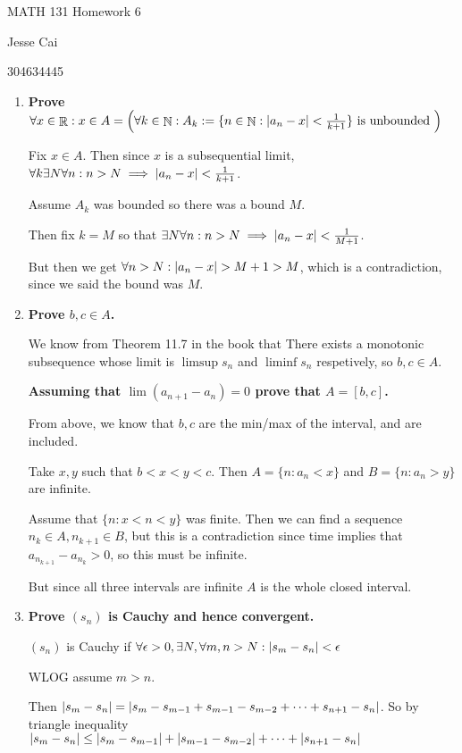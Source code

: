 \documentclass[10pt,a4paper]{article}
\DeclareMathOperator*{\R}{\mathbb{R}}
\DeclareMathOperator*{\N}{\mathbb{N}}
\DeclarePairedDelimiter{\abs}{\lvert}{\rvert}
\begin{document}
MATH 131 Homework 6

Jesse Cai

304634445

\begin{enumerate}
    \item \textbf{Prove $\forall x \in \R: x \in A  = \left(\forall k \in \N: A_k := \{n \in \N  : \abs{a_n - x} < \frac{1}{k+1}\} \text{ is unbounded } \right)$}

        Fix $x \in A$. Then since $x$ is a subsequential limit, $\forall k \exists N \forall n : n > N \implies \abs{a_{n} - x} < \frac{1}{k+1}$. 


        Assume $A_k$ was bounded so there was a bound $M$.

        Then fix $k = M$ so that $\exists N \forall n : n > N \implies \abs{a_{n} - x} < \frac{1}{M+1}$. 

        But then we get $\forall n > N: \abs{a_{n} -x} > M+1 > M$, which is a contradiction, since we said the bound was $M$.

    \item \textbf{Prove $b, c \in A$.}

        We know from Theorem 11.7 in the book that There exists a monotonic subsequence whose limit is $\limsup s_n$ and $\liminf s_n$ respetively, so $b, c \in A$.

        \textbf{Assuming that $\lim (a_{n+1} - a_n) = 0$ prove that $A = [b,c]$.}

        From above, we know that $b,c$ are the min/max of the interval, and are included. 

        Take $x,y$ such that $b < x < y < c$. Then $A = \{n: a_n < x\}$ and $B = \{n: a_n > y\}$ are infinite. 

        Assume that $\{n : x<n<y\}$ was finite. Then we can find a sequence $n_k \in A, n_{k+1} \in B$, but this is a contradiction since time implies that $a_{n_{k+1}} - a_{n_k} > 0$, so this must be infinite.

        But since all three intervals are infinite $A$ is the whole closed interval.

    \item \textbf{Prove $( s_n )$ is Cauchy and hence convergent.}

        $ (s_n)$ is Cauchy if $\forall \epsilon > 0, \exists N, \forall m, n > N: \abs{s_m - s_n} < \epsilon$

        WLOG assume $m>n$.

        Then $\abs{s_m - s_n } = \abs{s_m - s_{m-1} + s_{m-1} - s_{m-2} + \cdots + s_{n+1} - s_n}$. So by triangle inequality 
        $\abs{s_m - s_n } \leq \abs{s_m - s_{m-1}} +\abs{s_{m-1} - s_{m-2}} + \cdots + \abs{s_{n+1} - s_n}$


\end{enumerate}
\end{document}
